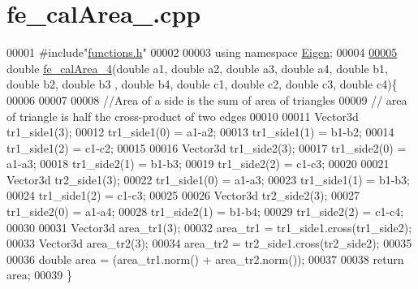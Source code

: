 \hypertarget{fe__cal_area__4_8cpp_source}{}\section{fe\+\_\+cal\+Area\+\_.\+cpp}
\label{fe__cal_area__4_8cpp_source}

\begin{DoxyCode}
00001 \textcolor{preprocessor}{#include"\hyperlink{functions_8h}{functions.h}"}
00002 
00003 \textcolor{keyword}{using namespace }\hyperlink{namespace_eigen}{Eigen};
00004 
\hyperlink{fe__cal_area__4_8cpp_ac1306a43db522f3da30471d2a6c48686}{00005} \textcolor{keywordtype}{double} \hyperlink{fe__cal_area__4_8cpp_ac1306a43db522f3da30471d2a6c48686}{fe\_calArea\_4}(\textcolor{keywordtype}{double} a1, \textcolor{keywordtype}{double} a2, \textcolor{keywordtype}{double} a3, \textcolor{keywordtype}{double} a4, \textcolor{keywordtype}{double} b1, \textcolor{keywordtype}{double} b2, \textcolor{keywordtype}{double} b3
      , \textcolor{keywordtype}{double} b4, \textcolor{keywordtype}{double} c1, \textcolor{keywordtype}{double} c2, \textcolor{keywordtype}{double} c3, \textcolor{keywordtype}{double} c4)\{
00006 
00007     
00008     \textcolor{comment}{//Area of a side is the sum of area of triangles}
00009     \textcolor{comment}{// area of triangle is half the cross-product of two edges}
00010 
00011     Vector3d tr1\_side1(3);
00012     tr1\_side1(0) = a1-a2;
00013     tr1\_side1(1) = b1-b2;
00014     tr1\_side1(2) = c1-c2;
00015 
00016     Vector3d tr1\_side2(3);
00017     tr1\_side2(0) = a1-a3;
00018     tr1\_side2(1) = b1-b3;
00019     tr1\_side2(2) = c1-c3;
00020 
00021         Vector3d tr2\_side1(3);
00022         tr1\_side1(0) = a1-a3;
00023         tr1\_side1(1) = b1-b3;
00024         tr1\_side1(2) = c1-c3;
00025 
00026         Vector3d tr2\_side2(3);
00027         tr1\_side2(0) = a1-a4;
00028         tr1\_side2(1) = b1-b4;
00029         tr1\_side2(2) = c1-c4;
00030 
00031     Vector3d area\_tr1(3);
00032     area\_tr1 = tr1\_side1.cross(tr1\_side2);
00033     Vector3d area\_tr2(3);
00034     area\_tr2 = tr2\_side1.cross(tr2\_side2);
00035 
00036     \textcolor{keywordtype}{double} area = (area\_tr1.norm() + area\_tr2.norm());
00037     
00038     \textcolor{keywordflow}{return} area;
00039 \}
\end{DoxyCode}
